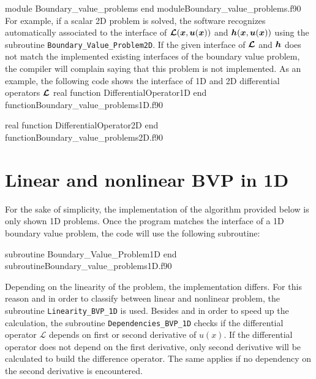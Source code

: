  \vspace{0.2cm} 
       {module Boundary_value_problems}
       {end module}{Boundary_value_problems.f90}
For example, if a scalar 2D problem is solved, the software recognizes automatically associated to the interface  of $  \boldsymbol{\mathcal{L}} (\boldsymbol{x},\boldsymbol{u}(\boldsymbol{x})) $ and $  \boldsymbol{h} (\boldsymbol{x},\boldsymbol{u}(\boldsymbol{x})) $ using the subroutine 
\verb|Boundary_Value_Problem2D|. If the given interface of $ \boldsymbol{\mathcal{L}} $ and $ \boldsymbol{h}$ does not match the implemented existing interfaces of the  boundary value problem, the compiler will complain saying that this problem is not implemented. 
As an example, the following code shows the interface of 1D and 2D differential operators $ \boldsymbol{\mathcal{L}} $
 \vspace{0.2cm} 
       {real function DifferentialOperator1D}
       {end function}{Boundary_value_problems1D.f90}
 
       {real function DifferentialOperator2D}
       {end function}{Boundary_value_problems2D.f90}


 

\newpage
\section{Linear and nonlinear BVP in 1D}
For the sake of simplicity, the implementation of the algorithm provided below   is only shown  1D problems.
Once the program matches the interface of a 1D boundary value problem, the code will use the following subroutine:  
 
       \vspace{0.5cm} 
       {subroutine Boundary_Value_Problem1D}
       {end subroutine}{Boundary_value_problems1D.f90}
 
Depending on the linearity of the problem, the implementation differs. For this reason and in order to classify between linear and nonlinear problem, the subroutine \verb|Linearity_BVP_1D| is used.
Besides and in order to speed up the calculation, the subroutine \verb|Dependencies_BVP_1D| checks if the differential operator
$ \mathcal{L} $ depends on 
first or second derivative of $ u(x) $. If the differential operator does not depend on the first derivative, only second derivative  will be calculated to build the difference operator. The same applies if no dependency on the second derivative is encountered. 


